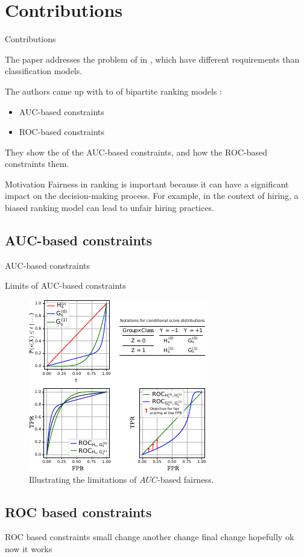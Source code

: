 \section{Contributions}
\begin{frame}{Contributions}

    The paper addresses the problem of  in , which have different requirements than classification models.
    
    The authors came up with  to  of bipartite ranking models :
  \begin{itemize}
      \item AUC-based constraints
      \item ROC-based constraints
  \end{itemize}
  
  They show the  of the AUC-based constraints, and how the ROC-based constraints  them.
\end{frame}

\begin{frame}{Motivation}
    Fairness in ranking is important because it can have a significant impact on the decision-making process. For example, in the context of hiring, a biased ranking model can lead to unfair hiring practices.
\end{frame}


\subsection{AUC-based constraints}
\begin{frame}{AUC-based constraints}

\end{frame}

\begin{frame}{Limits of AUC-based constraints}
    \begin{figure}[t]
        \centering
        \includegraphics[width=0.6\columnwidth]{images/original_paper/example_simple_dists_explained_with_table2.pdf}
        \caption{Illustrating the limitations of $AUC$-based fairness.}
        \label{fig:example-1}
    \end{figure}
\end{frame}

\subsection{ROC based constraints}
\begin{frame}{ROC based constraints}
    small change another change final change hopefully ok now it works
\end{frame}
